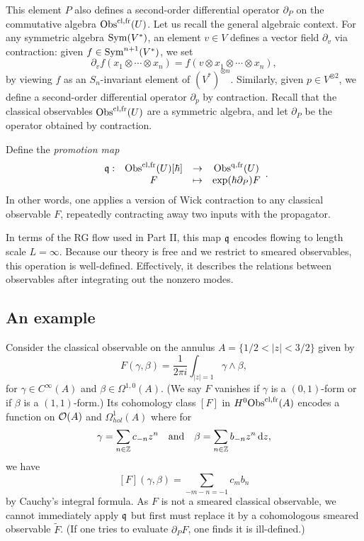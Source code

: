 This element $P$ also defines a second-order differential operator $\partial_P$ on the commutative algebra ${\rm Obs}^{{\rm cl},{\rm fr}}(U)$.
Let us recall the general algebraic context.
For any symmetric algebra ${\rm Sym}(V^*)$, an element $v \in V$ defines a vector field $\partial_v$ via contraction:
given $f \in {\rm Sym}^{n+1}(V^*)$, we set 
\[
\partial_v f(x_1 \otimes \cdots \otimes x_n) = f(v \otimes x_1 \otimes \cdots \otimes x_n),
\]
by viewing $f$ as an $S_n$-invariant element of $(V^*)^{\otimes n}$.
Similarly, given $p \in V^{\otimes 2}$, we define a second-order differential operator $\partial_p$ by contraction.
Recall that the classical observables ${\rm Obs}^{{\rm cl},{\rm fr}}(U)$ are a symmetric algebra,
and let $\partial_P$ be the operator obtained by contraction.

\begin{dfn}
Define the {\em promotion map}
\[
\begin{array}{cccc}
\frak{q}:& {\rm Obs}^{{\rm cl},{\rm fr}}(U)[\hbar] &\to& {\rm Obs}^{{\rm q},{\rm fr}}(U)\\
& F & \mapsto & \exp(\hbar \partial_P)F
\end{array}.
\]
In other words, one applies a version of Wick contraction to any classical observable $F$,
repeatedly contracting away two inputs with the propagator.
\end{dfn}

\begin{rmk}
In terms of the RG flow used in Part II, this map $\frak{q}$ encodes flowing to length scale $L = \infty$.
Because our theory is free and we restrict to smeared observables, this operation is well-defined.
Effectively, it describes the relations between observables after integrating out the nonzero modes.
\end{rmk}

\subsection{An example}
\label{circ ex}

Consider the classical observable on the annulus $A = \{1/2 < |z| < 3/2\}$ given by
\[
F(\gamma,\beta) = \frac{1}{2\pi i}\int_{|z| = 1} \gamma \wedge \beta,
\]
for $\gamma \in C^\infty(A)$ and $\beta \in \Omega^{1,0}(A)$.
(We say $F$ vanishes if $\gamma$ is a $(0,1)$-form or if $\beta$ is a $(1,1)$-form.)
Its cohomology class $[F]$ in $H^0 {\rm Obs}^{{\rm cl},{\rm fr}}(A)$ encodes a function on $\mathcal O(A)$ and $\Omega^1_{hol}(A)$
where for 
\[
\gamma = \sum_{n \in \mathbb Z} c_{-n} z^n \quad \text{and} \quad \beta = \sum_{n \in \mathbb Z} b_{-n} z^n \, {\rm d} z,
\]
we have
\[
[F](\gamma,\beta) =  \sum_{-m - n = -1} c_m b_n
\]
by Cauchy's integral formula.
As $F$ is not a smeared classical observable, 
we cannot immediately apply $\frak{q}$ but first must replace it by a cohomologous smeared observable $\widetilde{F}$.
(If one tries to evaluate $\partial_P F$, one finds it is ill-defined.)

